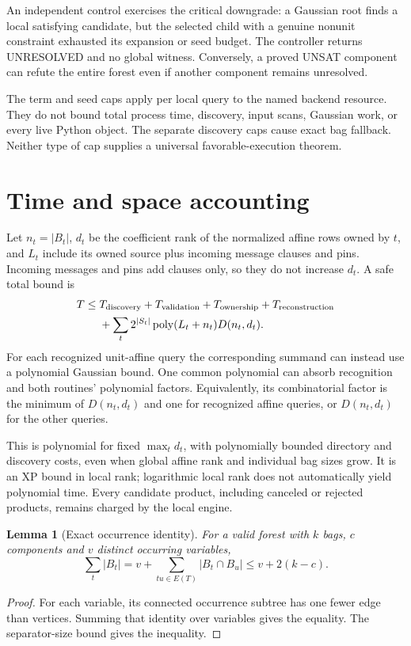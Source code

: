 \documentclass[11pt]{article}
\newtheorem{lemma}[theorem]{Lemma}
\newcommand{\poly}{\operatorname{poly}}
\begin{document}
An independent control exercises the critical downgrade: a Gaussian root
finds a local satisfying candidate, but the selected child with a genuine
nonunit constraint exhausted its expansion or seed budget. The controller
returns UNRESOLVED and no global witness. Conversely, a proved UNSAT component
can refute the entire forest even if another component remains unresolved.

The term and seed caps apply per local query to the named backend resource.
They do not bound total process time, discovery, input scans, Gaussian work,
or every live Python object. The separate discovery caps cause exact bag
fallback. Neither type of cap supplies a universal favorable-execution theorem.

\section{Time and space accounting}
Let \(n_t=|B_t|\), \(d_t\) be the coefficient rank of the normalized affine
rows owned by \(t\), and \(L_t\) include its owned source plus incoming
message clauses and pins. Incoming messages and pins add clauses only, so
they do not increase \(d_t\). A safe total bound is
\[
\begin{split}
 T \le {}& T_{\rm discovery}+T_{\rm validation}+T_{\rm ownership}
       +T_{\rm reconstruction}\\
 &+\sum_t 2^{|S_t|}\poly(L_t+n_t)D(n_t,d_t).
\end{split}
\]
For each recognized unit-affine query the corresponding summand can instead
use a polynomial Gaussian bound. One common polynomial can absorb recognition
and both routines' polynomial factors. Equivalently, its combinatorial factor
is the minimum of \(D(n_t,d_t)\) and one for recognized affine queries,
or \(D(n_t,d_t)\) for the other queries.

This is polynomial for fixed \(\max_t d_t\), with polynomially bounded
directory and discovery costs, even when global affine rank and individual
bag sizes grow. It is an XP bound in local rank; logarithmic local rank
does not automatically yield polynomial time. Every candidate product,
including canceled or rejected products, remains charged by the local engine.

\begin{lemma}[Exact occurrence identity]
For a valid forest with \(k\) bags, \(c\) components and \(v\) distinct
occurring variables,
\[
 \sum_t |B_t|=v+\sum_{tu\in E(T)}|B_t\cap B_u|
 \le v+2(k-c).
\]
\end{lemma}
\begin{proof}
For each variable, its connected occurrence subtree has one fewer edge than
vertices. Summing that identity over variables gives the equality. The
separator-size bound gives the inequality.
\end{proof}
\end{document}
